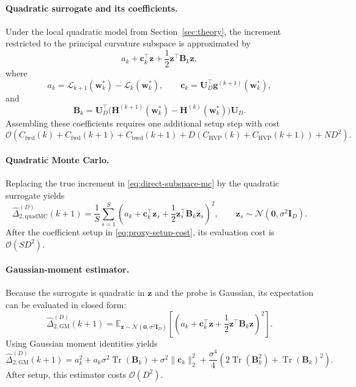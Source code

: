 \documentclass{article}
\begin{document}
\paragraph{Quadratic surrogate and its coefficients.}
Under the local quadratic model from Section~\ref{sec:theory}, the increment restricted to the principal curvature subspace is approximated by
\[
a_k + \mathbf c_k^\top \mathbf z + \frac12 \mathbf z^\top \mathbf B_k \mathbf z,
\]
where
\[
a_k = \mathcal L_{k+1}(\mathbf w_k^*)-\mathcal L_k(\mathbf w_k^*),\qquad
\mathbf c_k = \mathbf U_D^\top \mathbf g^{(k+1)}(\mathbf w_k^*),
\]
and
\[
\mathbf B_k
=
\mathbf U_D^\top
\bigl(
\mathbf H^{(k+1)}(\mathbf w_k^*)-\mathbf H^{(k)}(\mathbf w_k^*)
\bigr)
\mathbf U_D.
\]
Assembling these coefficients requires one additional setup step with cost
\begin{equation}
\label{eq:proxy-setup-cost}
\mathcal O\!\left(
C_{\mathrm{fwd}}(k)+C_{\mathrm{fwd}}(k+1)
+
C_{\mathrm{bwd}}(k+1)
+
D(C_{\mathrm{HVP}}(k)+C_{\mathrm{HVP}}(k+1))
+
ND^2
\right).
\end{equation}

\paragraph{Quadratic Monte Carlo.}
Replacing the true increment in \eqref{eq:direct-subspace-mc} by the quadratic surrogate yields
\begin{equation}
\label{eq:quad-subspace-mc}
\widehat{\Delta}_{2,\mathrm{quadMC}}^{(D)}(k+1)
=
\frac{1}{S}\sum_{s=1}^S
\left(
a_k + \mathbf c_k^\top \mathbf z_s + \frac12 \mathbf z_s^\top \mathbf B_k \mathbf z_s
\right)^2,
\qquad
\mathbf z_s \sim \mathcal N(\mathbf 0,\sigma^2\mathbf I_D).
\end{equation}
After the coefficient setup in \eqref{eq:proxy-setup-cost}, its evaluation cost is $\mathcal O(SD^2)$.

\paragraph{Gaussian-moment estimator.}
Because the surrogate is quadratic in $\mathbf z$ and the probe is Gaussian, its expectation can be evaluated in closed form:
\begin{equation}
\label{eq:quad-closed-form}
\widehat{\Delta}_{2,\mathrm{GM}}^{(D)}(k+1)
=
\mathbb E_{\mathbf z\sim\mathcal N(\mathbf 0, \sigma^2 \mathbf I_D)}
\left[
\left(
a_k + \mathbf c_k^\top \mathbf z + \frac12 \mathbf z^\top \mathbf B_k \mathbf z
\right)^2
\right].
\end{equation}
Using Gaussian moment identities yields
\begin{equation}
\label{eq:quad-closed-form-expanded}
\widehat{\Delta}_{2,\mathrm{GM}}^{(D)}(k+1)
=
a_k^2
+
a_k \sigma^2 \operatorname{Tr}(\mathbf B_k)
+
\sigma^2 \|\mathbf c_k\|_2^2
+
\frac{\sigma^4}{4}
\left(
2\operatorname{Tr}(\mathbf B_k^2)
+
\operatorname{Tr}(\mathbf B_k)^2
\right).
\end{equation}
After setup, this estimator costs $\mathcal O(D^2)$.
\end{document}
